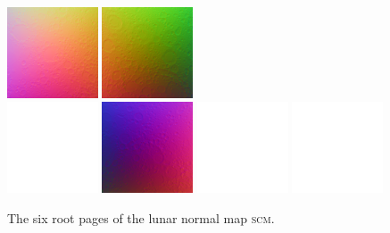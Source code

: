 \documentclass[oneside,10pt]{memoir}
\newcommand{\scm}     {\textsc{scm}}
\begin{document}
\begin{Spacing}{1.1}
\begin{figure}
  \includegraphics[width=0.24\textwidth]{fig/dtmn0.png}
  \includegraphics[width=0.24\textwidth]{fig/dtmn5.png}\\\vspace{1pt}
  \includegraphics[width=0.24\textwidth]{fig/blank.pdf}
  \includegraphics[width=0.24\textwidth]{fig/dtmn3.png}
  \includegraphics[width=0.24\textwidth]{fig/blank.pdf}
  \includegraphics[width=0.24\textwidth]{fig/blank.pdf}
  \caption{The six root pages of the lunar normal map \scm.}
  \label{fig:dtmn}
\end{figure}


\end{Spacing}
\end{document}
